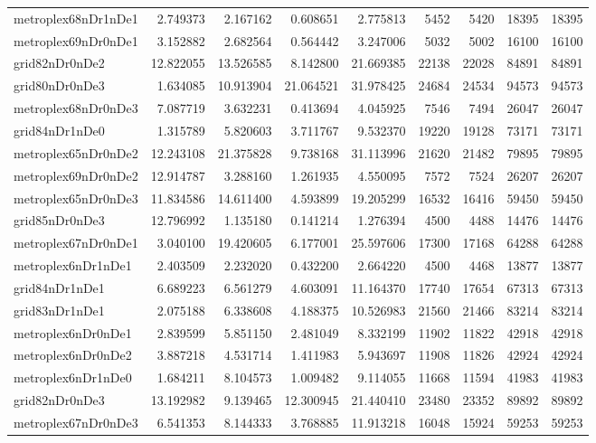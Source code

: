 \begin{longtable}{|l|r|r|r|r|r|r|r|r|}
metroplex68nDr1nDe1 & 2.749373 & 2.167162 & 0.608651 & 2.775813 & 5452 & 5420 & 18395 & 18395 \\
metroplex69nDr0nDe1 & 3.152882 & 2.682564 & 0.564442 & 3.247006 & 5032 & 5002 & 16100 & 16100 \\
grid82nDr0nDe2 & 12.822055 & 13.526585 & 8.142800 & 21.669385 & 22138 & 22028 & 84891 & 84891 \\
grid80nDr0nDe3 & 1.634085 & 10.913904 & 21.064521 & 31.978425 & 24684 & 24534 & 94573 & 94573 \\
metroplex68nDr0nDe3 & 7.087719 & 3.632231 & 0.413694 & 4.045925 & 7546 & 7494 & 26047 & 26047 \\
grid84nDr1nDe0 & 1.315789 & 5.820603 & 3.711767 & 9.532370 & 19220 & 19128 & 73171 & 73171 \\
metroplex65nDr0nDe2 & 12.243108 & 21.375828 & 9.738168 & 31.113996 & 21620 & 21482 & 79895 & 79895 \\
metroplex69nDr0nDe2 & 12.914787 & 3.288160 & 1.261935 & 4.550095 & 7572 & 7524 & 26207 & 26207 \\
metroplex65nDr0nDe3 & 11.834586 & 14.611400 & 4.593899 & 19.205299 & 16532 & 16416 & 59450 & 59450 \\
grid85nDr0nDe3 & 12.796992 & 1.135180 & 0.141214 & 1.276394 & 4500 & 4488 & 14476 & 14476 \\
metroplex67nDr0nDe1 & 3.040100 & 19.420605 & 6.177001 & 25.597606 & 17300 & 17168 & 64288 & 64288 \\
metroplex6nDr1nDe1 & 2.403509 & 2.232020 & 0.432200 & 2.664220 & 4500 & 4468 & 13877 & 13877 \\
grid84nDr1nDe1 & 6.689223 & 6.561279 & 4.603091 & 11.164370 & 17740 & 17654 & 67313 & 67313 \\
grid83nDr1nDe1 & 2.075188 & 6.338608 & 4.188375 & 10.526983 & 21560 & 21466 & 83214 & 83214 \\
metroplex6nDr0nDe1 & 2.839599 & 5.851150 & 2.481049 & 8.332199 & 11902 & 11822 & 42918 & 42918 \\
metroplex6nDr0nDe2 & 3.887218 & 4.531714 & 1.411983 & 5.943697 & 11908 & 11826 & 42924 & 42924 \\
metroplex6nDr1nDe0 & 1.684211 & 8.104573 & 1.009482 & 9.114055 & 11668 & 11594 & 41983 & 41983 \\
grid82nDr0nDe3 & 13.192982 & 9.139465 & 12.300945 & 21.440410 & 23480 & 23352 & 89892 & 89892 \\
metroplex67nDr0nDe3 & 6.541353 & 8.144333 & 3.768885 & 11.913218 & 16048 & 15924 & 59253 & 59253 \\

\end{longtable}
